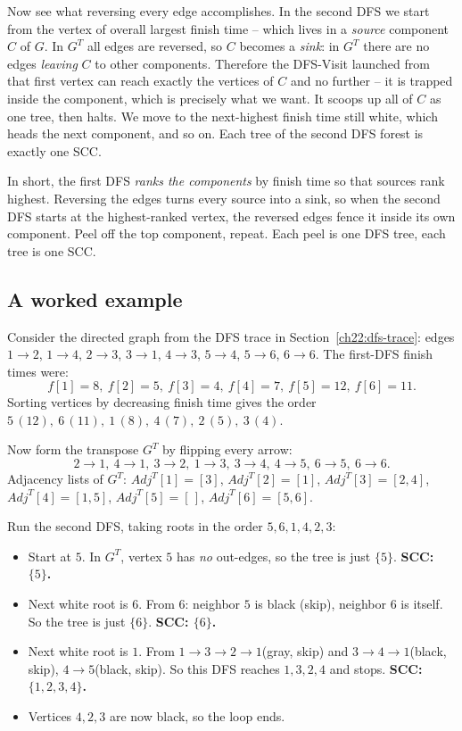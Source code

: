 Now see what reversing every edge accomplishes. In the second DFS we start from the vertex of
overall largest finish time -- which lives in a \emph{source} component $C$ of
$G$. In $G^{T}$ all edges are reversed, so $C$ becomes a \emph{sink}: in $G^T$
there are no edges \emph{leaving} $C$ to other components. Therefore the DFS-Visit
launched from that first vertex can reach exactly the vertices of $C$ and no
further -- it is trapped inside the component, which is precisely what we want.
It scoops up all of $C$ as one tree, then halts. We move to the next-highest
finish time still white, which heads the next component, and so on. Each tree of
the second DFS forest is exactly one SCC.

\begin{intuitionbox}
In short, the first DFS \emph{ranks the components}
by finish time so that sources rank highest. Reversing the edges turns every
source into a sink, so when the second DFS starts at the highest-ranked vertex,
the reversed edges fence it inside its own component. Peel off the top component,
repeat. Each peel is one DFS tree, each tree is one SCC.
\end{intuitionbox}

\subsection{A worked example}

Consider the directed graph from the DFS trace in
Section~\ref{ch22:dfs-trace}: edges $1\to2$, $1\to4$, $2\to3$, $3\to1$, $4\to3$,
$5\to4$, $5\to6$, $6\to6$. The first-DFS finish times were:
\[
f[1]=8,\ f[2]=5,\ f[3]=4,\ f[4]=7,\ f[5]=12,\ f[6]=11.
\]
Sorting vertices by decreasing finish time gives the order
$5\,(12),\ 6\,(11),\ 1\,(8),\ 4\,(7),\ 2\,(5),\ 3\,(4)$.

Now form the transpose $G^{T}$ by flipping every arrow:
\[
2\to1,\ 4\to1,\ 3\to2,\ 1\to3,\ 3\to4,\ 4\to5,\ 6\to5,\ 6\to6.
\]
Adjacency lists of $G^{T}$:
$\mathit{Adj}^{T}[1]=[3]$, $\mathit{Adj}^{T}[2]=[1]$, $\mathit{Adj}^{T}[3]=[2,4]$,
$\mathit{Adj}^{T}[4]=[1,5]$, $\mathit{Adj}^{T}[5]=[\,]$,
$\mathit{Adj}^{T}[6]=[5,6]$.

Run the second DFS, taking roots in the order $5, 6, 1, 4, 2, 3$:
\begin{itemize}
\item Start at $5$. In $G^{T}$, vertex $5$ has \emph{no} out-edges, so the tree
is just $\{5\}$. \textbf{SCC: $\{5\}$.}
\item Next white root is $6$. From $6$: neighbor $5$ is black (skip), neighbor
$6$ is itself. So the tree is just $\{6\}$. \textbf{SCC: $\{6\}$.}
\item Next white root is $1$. From $1 \to 3 \to 2 \to 1$(gray, skip) and
$3 \to 4 \to 1$(black, skip), $4 \to 5$(black, skip). So this DFS reaches
$1, 3, 2, 4$ and stops. \textbf{SCC: $\{1, 2, 3, 4\}$.}
\item Vertices $4, 2, 3$ are now black, so the loop ends.
\end{itemize}

